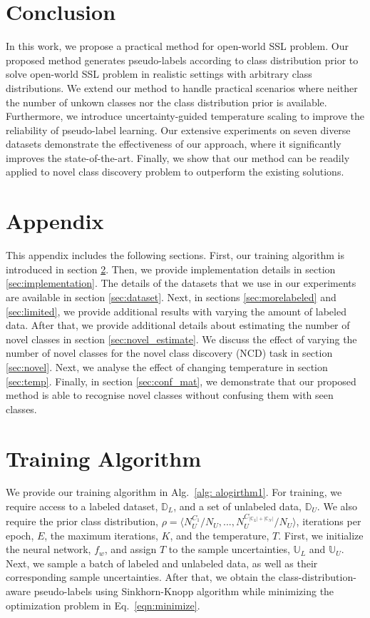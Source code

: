 \documentclass[runningheads]{eccv2022submission}
\begin{document}
\section{Conclusion}
In this work, we propose a practical method for open-world SSL problem. Our proposed method generates pseudo-labels according to class distribution prior to solve open-world SSL problem in realistic settings with arbitrary class distributions. We extend our method to handle practical scenarios where neither the number of unkown classes nor the class distribution prior is available. Furthermore, we introduce uncertainty-guided temperature scaling to improve the reliability of pseudo-label learning. Our extensive experiments on seven diverse datasets demonstrate the effectiveness of our approach, where it significantly improves the state-of-the-art. Finally, we show that our method can be readily applied to novel class discovery problem to outperform the existing solutions.

\clearpage




\appendix
\section*{Appendix}
This appendix includes the following sections. First, our training algorithm is introduced in section \ref{sec:alogrithm}. Then, we provide implementation details in section \ref{sec:implementation}. The details of the datasets that we use in our experiments are available in section \ref{sec:dataset}. Next, in sections \ref{sec:morelabeled} and \ref{sec:limited}, we provide additional results with varying the amount of labeled data. After that, we provide additional details about estimating the number of novel classes in section \ref{sec:novel_estimate}. We discuss the effect of varying the number of novel classes for the novel class discovery (NCD) task in section \ref{sec:novel}. Next, we analyse the effect of changing temperature in section \ref{sec:temp}. Finally, in section \ref{sec:conf_mat}, we demonstrate that our proposed method is able to recognise novel classes without confusing them with seen classes. 

\section{Training Algorithm}
\label{sec:alogrithm}

We provide our training algorithm in Alg.~\ref{alg: alogirthm1}. For training, we require access to a labeled dataset, $\mathbb{D}_L$, and a set of unlabeled data, $\mathbb{D}_U$. We also require the prior class distribution, $\rho = \langle N_{U}^{C_1}/{N_U,...,N_{U}^{C_{|\mathbb{C}_L|+|\mathbb{C}_N|}}}/N_U \rangle$, iterations per epoch, $E$, the maximum iterations, $K$, and the temperature, $T$. First, we initialize the neural network, $f_w$, and assign $T$ to the sample uncertainties, $\mathbb{U}_L$ and $\mathbb{U}_U$. Next, we sample a batch of labeled and unlabeled data, as well as their corresponding sample uncertainties. After that, we obtain the class-distribution-aware pseudo-labels using Sinkhorn-Knopp algorithm\cite{sinkhorn1967concerning} while minimizing the optimization problem in Eq.~\ref{eqn:minimize}. 
\end{document}
